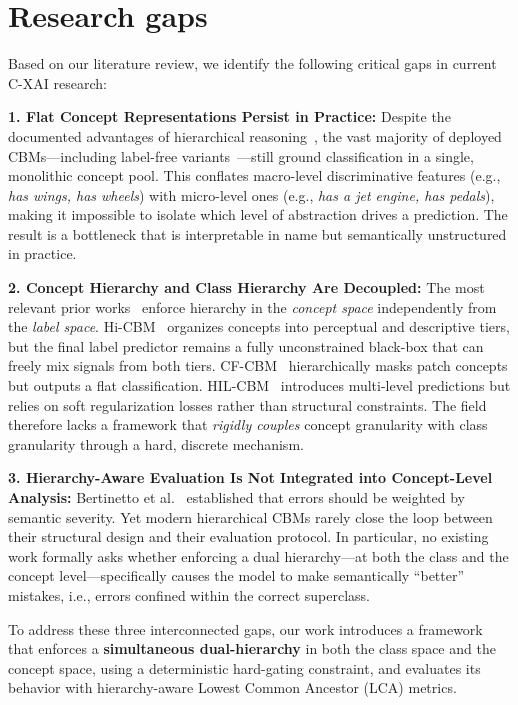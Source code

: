 \documentclass[sigconf, nonacm]{acmart}
\begin{document}
\section{Research gaps}
Based on our literature review, we identify the following critical gaps in current C-XAI research:

\textbf{1. Flat Concept Representations Persist in Practice:} Despite the documented advantages of hierarchical reasoning~\cite{Hase_2019, Uyterlinde_2026}, the vast majority of deployed CBMs---including label-free variants~\cite{Xie_2026, Pastor_2026_tutorial}---still ground classification in a single, monolithic concept pool. This conflates macro-level discriminative features (e.g., \textit{has wings, has wheels}) with micro-level ones (e.g., \textit{has a jet engine, has pedals}), making it impossible to isolate which level of abstraction drives a prediction. The result is a bottleneck that is interpretable in name but semantically unstructured in practice.

\textbf{2. Concept Hierarchy and Class Hierarchy Are Decoupled:} The most relevant prior works~\cite{Sun_2026, Panousis_2023} enforce hierarchy in the \textit{concept space} independently from the \textit{label space}. Hi-CBM~\cite{Sun_2026} organizes concepts into perceptual and descriptive tiers, but the final label predictor remains a fully unconstrained black-box that can freely mix signals from both tiers. CF-CBM~\cite{Panousis_2023} hierarchically masks patch concepts but outputs a flat classification. HIL-CBM~\cite{Xie_2026} introduces multi-level predictions but relies on soft regularization losses rather than structural constraints. The field therefore lacks a framework that \textit{rigidly couples} concept granularity with class granularity through a hard, discrete mechanism.

\textbf{3. Hierarchy-Aware Evaluation Is Not Integrated into Concept-Level Analysis:} Bertinetto et al.~\cite{Bertinetto_2020} established that errors should be weighted by semantic severity. Yet modern hierarchical CBMs rarely close the loop between their structural design and their evaluation protocol. In particular, no existing work formally asks whether enforcing a dual hierarchy---at both the class and the concept level---specifically causes the model to make semantically ``better'' mistakes, i.e., errors confined within the correct superclass.

To address these three interconnected gaps, our work introduces a framework that enforces a \textbf{simultaneous dual-hierarchy} in both the class space and the concept space, using a deterministic hard-gating constraint, and evaluates its behavior with hierarchy-aware Lowest Common Ancestor (LCA) metrics.
\end{document}
